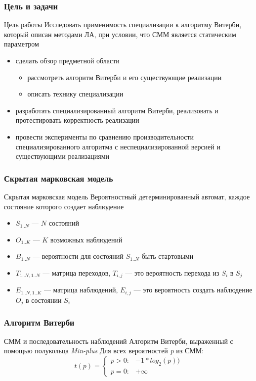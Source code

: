 \documentclass{beamer}
\begin{document}
\begin{frame}[fragile]
	\frametitle{Цель и задачи}
	\begin{block}{Цель работы}
		Исследовать применимость специализации к алгоритму Витерби, который описан методами ЛА,
при условии, что СММ является статическим параметром
	\end{block}
	\vfill
\begin{itemize}
	\item сделать обзор предметной области
		\begin{itemize}
			\item рассмотреть алгоритм Витерби и его существующие реализации
			\item описать технику специализации
		\end{itemize}
	\item разработать специализированный алгоритм Витерби, реализовать и протестировать корректность реализации
	\item провести эксперименты по сравнению производительности специализированного алгоритма с неспециализированной версией и существующими реализациями
\end{itemize}
\end{frame}

\begin{frame}[fragile]
	\frametitle{Скрытая марковская модель}
	\begin{block}{Скрытая марковская модель}
		Вероятностный детерминированный автомат, каждое состояние которого создает наблюдение
		\begin{itemize}
			\item $\mathit{S_{1..N}}$ --- $N$ состояний
			\item $\mathit{O_{1..K}}$ --- $K$ возможных наблюдений
			\item $\mathit{B_{1..N}}$ --- вероятности для состояний $\mathit{S_{1..N}}$ быть стартовыми 
			\item $\mathit{T_{1..N, 1..N}}$ --- матрица переходов, $\mathit{T_{i,j}}$ --- это вероятность перехода из $\mathit{S_{i}}$ в $\mathit{S_{j}}$
			\item $\mathit{E_{1..N, 1..K}}$ --- матрица наблюдений, $\mathit{E_{i,j}}$ --- это вероятность создать наблюдение 
$\mathit{O_{j}}$ в состоянии $\mathit{S_{i}}$
		\end{itemize}
	\end{block}
	\vfill
\end{frame}


\begin{frame}[fragile]
	\frametitle{Алгоритм Витерби}
СММ и последовательность наблюдений
\vfill
Алгоритм Витерби, выраженный с помощью полукольца \emph{Min-plus}
\vfill
Для всех вероятностей \emph{p} из СММ:
\[  t(p) =
    \begin{cases}
      p > 0: & -1 * log_{2}(p))\\
      p = 0: & +\infty
    \end{cases}       
\]
\end{frame}
\end{document}
